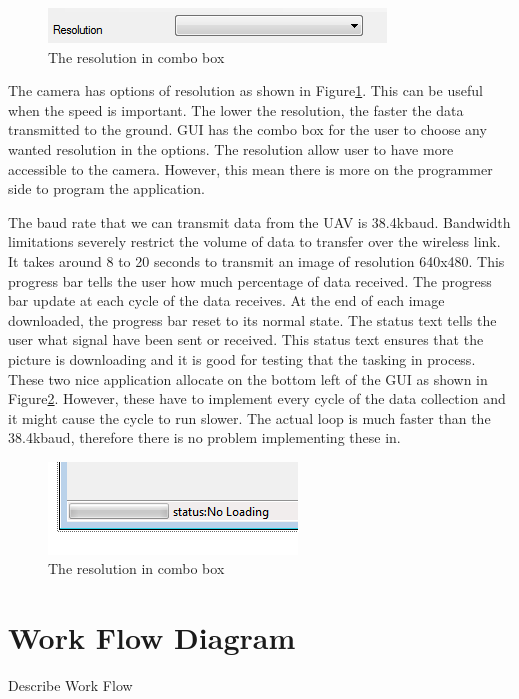 \begin{figure}[H]
\begin{center}
\includegraphics[scale=1]{figures/resolutionOption.PNG} 
\end{center}
\caption{The resolution in combo box\label{resolutionOption}}
\end{figure}
The camera has options of resolution as shown in Figure\ref{resolutionOption}. This can be useful when the speed is important. The lower the resolution, the faster the data transmitted to the ground. GUI has the combo box for the user to choose any wanted resolution in the options. The resolution allow user to have more accessible to the camera. However, this mean there is more on the programmer side to program the application.


The baud rate that we can transmit data from the UAV is 38.4kbaud. Bandwidth limitations severely restrict the volume of data to transfer over the wireless link. It takes around 8 to 20 seconds to transmit an image of resolution 640x480. This progress bar tells the user how much percentage of data received. The progress bar update at each cycle of the data receives. At the end of each image downloaded, the progress bar reset to its normal state.  The status text tells the user what signal have been sent or received. This status text ensures that the picture is downloading and it is good for testing that the tasking in process. These two nice application allocate on the bottom left of the GUI as shown in Figure\ref{progressBar}. However, these have to implement every cycle of the data collection and it might cause the cycle to run slower. The actual loop is much faster than the 38.4kbaud, therefore there is no problem implementing these in.
\begin{figure}[!hbtp]
\begin{center}
\includegraphics[scale=1]{figures/progressBar.PNG} 
\end{center}
\caption{The resolution in combo box\label{progressBar}}
\end{figure}


\section{Work Flow Diagram}
Describe Work Flow

